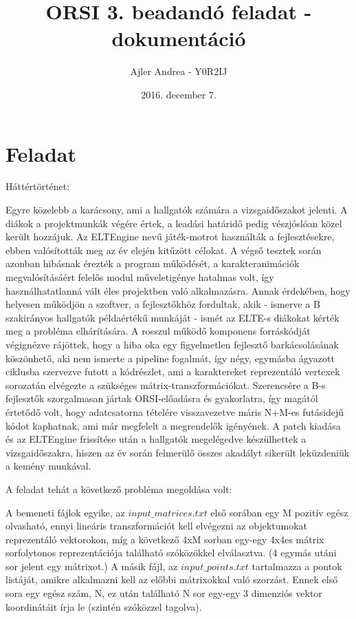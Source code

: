 \documentclass{article}
\title{ORSI 3. beadandó feladat - dokumentáció}
\author{Ajler Andrea - Y0R2IJ}
\date{2016. december 7.}
\begin{document}
\maketitle
\section{Feladat}

Háttértörténet:

Egyre közelebb a karácsony, ami a hallgatók számára a vizsgaidőszakot jelenti. A diákok a projektmunkák végére értek, a leadási határidő pedig vészjóslóan közel került hozzájuk. Az ELTEngine nevű játék-motrot használták a fejlesztésekre, ebben valósították meg az év elején kitűzött célokat. A végső tesztek során azonban hibásnak érezték a program működését, a karakteranimációk megvalósításáért felelős modul műveletigénye hatalmas volt, így használhatatlanná vált éles projektben való alkalmazásra. Annak érdekében, hogy helyesen működjön a szoftver, a fejlesztőkhöz fordultak, akik - ismerve a B szakirányos hallgatók példaértékű munkáját - ismét az ELTE-s diákokat kérték meg a probléma elhárítására. A rosszul működő komponens forráskódját végignézve rájöttek, hogy a hiba oka egy figyelmetlen fejlesztő barkácsolásának köszönhető, aki nem ismerte a pipeline fogalmát, így négy, egymásba ágyazott ciklusba szervezve futott a kódrészlet, ami a karaktereket reprezentáló vertexek sorozatán elvégezte a szükséges mátrix-transzformációkat. Szerencsére a B-s fejlesztők szorgalmasan jártak ORSI-előadásra és gyakorlatra, így magától értetődő volt, hogy adatcsatorna tételére visszavezetve máris N+M-es futásidejű kódot kaphatnak, ami már megfelelt a megrendelők igényének. A patch kiadása és az ELTEngine frissítése után a hallgatók megelégedve készülhettek a vizsgaidőszakra, hiszen az év során felmerülő összes akadályt sikerült leküzdeniük a kemény munkával.

A feladat tehát a következő probléma megoldása volt:

    

A bemeneti fájlok egyike, az $input\_matrices.txt$ első sorában egy M pozitív egész olvasható, ennyi lineáris transzformációt kell elvégezni az objektumokat reprezentáló vektorokon, míg a következő 4xM sorban egy-egy 4x4es mátrix sorfolytonos reprezentációja található szóközökkel elválasztva. (4 egymás utáni sor jelent egy mátrixot.) A másik fájl, az $input\_points.txt$ tartalmazza a pontok listáját, amikre alkalmazni kell az előbbi mátrixokkal való szorzást. Ennek első sora egy egész szám, N, ez után található N sor egy-egy 3 dimenziós vektor koordinátáit írja le (szintén szóközzel tagolva).
\end{document}

